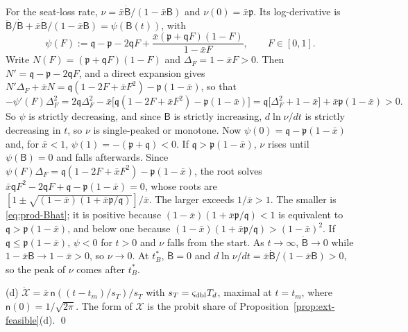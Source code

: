For the seat-loss rate, $\nu=\bar x\dot{\mathsf B}/(1-\bar x\mathsf B)$ and $\nu(0)=\bar x\mathfrak p$. Its log-derivative is $\ddot{\mathsf B}/\dot{\mathsf B}+\bar x\dot{\mathsf B}/(1-\bar x\mathsf B)=\psi(\mathsf B(t))$, with
\[
\psi(F):=\mathfrak q-\mathfrak p-2\mathsf qF+\frac{\bar x(\mathfrak p+\mathsf qF)(1-F)}{1-\bar xF},\qquad F\in[0,1].
\]
Write $N(F)=(\mathfrak p+\mathsf qF)(1-F)$ and $\Delta_F=1-\bar xF>0$. Then $N'=\mathfrak q-\mathfrak p-2\mathsf qF$, and a direct expansion gives $N'\Delta_F+\bar xN=\mathfrak q(1-2F+\bar xF^2)-\mathfrak p(1-\bar x)$, so that
\[
-\psi'(F)\Delta_F^2=2\mathfrak q\Delta_F^2-\bar x\bigl[\mathfrak q(1-2F+\bar xF^2)-\mathfrak p(1-\bar x)\bigr]=\mathfrak q\bigl[\Delta_F^2+1-\bar x\bigr]+\bar x\mathfrak p(1-\bar x)>0 .
\]
So $\psi$ is strictly decreasing, and since $\mathsf B$ is strictly increasing, $d\ln\nu/dt$ is strictly decreasing in $t$, so $\nu$ is single-peaked or monotone. Now $\psi(0)=\mathfrak q-\mathfrak p(1-\bar x)$ and, for $\bar x<1$, $\psi(1)=-(\mathfrak p+\mathfrak q)<0$. If $\mathfrak q>\mathfrak p(1-\bar x)$, $\nu$ rises until $\psi(\mathsf B)=0$ and falls afterwards. Since $\psi(F)\Delta_F=\mathfrak q(1-2F+\bar xF^2)-\mathfrak p(1-\bar x)$, the root solves $\bar x\mathsf qF^2-2\mathsf qF+\mathfrak q-\mathfrak p(1-\bar x)=0$, whose roots are $[1\pm\sqrt{(1-\bar x)(1+\bar x\mathfrak p/\mathfrak q)}]/\bar x$. The larger exceeds $1/\bar x>1$. The smaller is \eqref{eq:prod-Bhat}; it is positive because $(1-\bar x)(1+\bar x\mathfrak p/\mathfrak q)<1$ is equivalent to $\mathfrak q>\mathfrak p(1-\bar x)$, and below one because $(1-\bar x)(1+\bar x\mathfrak p/\mathfrak q)>(1-\bar x)^2$. If $\mathfrak q\le\mathfrak p(1-\bar x)$, $\psi<0$ for $t>0$ and $\nu$ falls from the start. As $t\to\infty$, $\dot{\mathsf B}\to 0$ while $1-\bar x\mathsf B\to 1-\bar x>0$, so $\nu\to 0$. At $t^*_B$, $\ddot{\mathsf B}=0$ and $d\ln\nu/dt=\bar x\dot{\mathsf B}/(1-\bar x\mathsf B)>0$, so the peak of $\nu$ comes after $t^*_B$.

(d) $\dot{\mathcal X}=\bar x\,\mathsf n((t-t_m)/s_T)/s_T$ with $s_T=\varsigma_{\rm dbl}T_d$, maximal at $t=t_m$, where $\mathsf n(0)=1/\sqrt{2\pi}$. The form of $\mathcal X$ is the probit share of Proposition~\ref{prop:ext-feasible}(d). \qed

